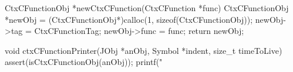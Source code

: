 \startCCode
CtxCFunctionObj *newCtxCFunction(CtxCFunction *func) {
  CtxCFunctionObj *newObj =
    (CtxCFunctionObj*)calloc(1, sizeof(CtxCFunctionObj));
  newObj->tag  = CtxCFunctionTag;
  newObj->func = func;
  return newObj;
}

void ctxCFunctionPrinter(JObj *anObj, Symbol *indent, size_t timeToLive) {
  assert(isCtxCFunctionObj(anObj));
  printf("%
}
\stopCCode

